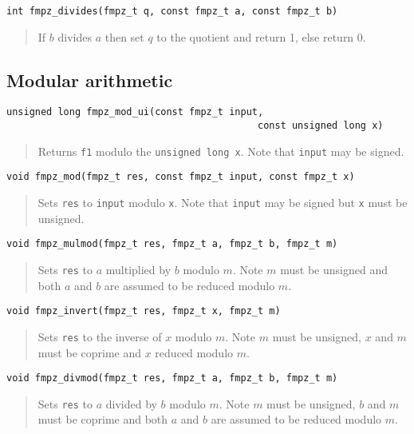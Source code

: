 \documentclass[a4paper,10pt]{article}
\newcommand{\code}{\lstinline}
\begin{document}
\begin{lstlisting}
int fmpz_divides(fmpz_t q, const fmpz_t a, const fmpz_t b) 
\end{lstlisting}
\begin{quote}
If $b$ divides $a$ then set $q$ to the quotient and return 1, else return 0.
\end{quote}

\subsection{Modular arithmetic}

\begin{lstlisting}
unsigned long fmpz_mod_ui(const fmpz_t input, 
                                            const unsigned long x)
\end{lstlisting}
\begin{quote}
Returns \code{f1} modulo the \code{unsigned long x}. Note that \code{input} may be signed.
\end{quote}

\begin{lstlisting}
void fmpz_mod(fmpz_t res, const fmpz_t input, const fmpz_t x) 
\end{lstlisting}
\begin{quote}
Sets \code{res} to \code{input} modulo \code{x}. Note that \code{input} may be signed but \code{x} must be unsigned.
\end{quote}

\begin{lstlisting}
void fmpz_mulmod(fmpz_t res, fmpz_t a, fmpz_t b, fmpz_t m) 
\end{lstlisting}
\begin{quote}
Sets \code{res} to $a$ multiplied by $b$ modulo $m$. Note $m$ must be unsigned and both $a$ and $b$ are assumed to be reduced modulo $m$.
\end{quote}

\begin{lstlisting}
void fmpz_invert(fmpz_t res, fmpz_t x, fmpz_t m) 
\end{lstlisting}
\begin{quote}
Sets \code{res} to the inverse of $x$ modulo $m$. Note $m$ must be unsigned, $x$ and $m$ must be coprime and $x$ reduced modulo $m$.
\end{quote}

\begin{lstlisting}
void fmpz_divmod(fmpz_t res, fmpz_t a, fmpz_t b, fmpz_t m) 
\end{lstlisting}
\begin{quote}
Sets \code{res} to $a$ divided by $b$ modulo $m$. Note $m$ must be unsigned, $b$ and $m$ must be coprime and both $a$ and $b$ are assumed to be reduced modulo $m$.
\end{quote}
\end{document}
